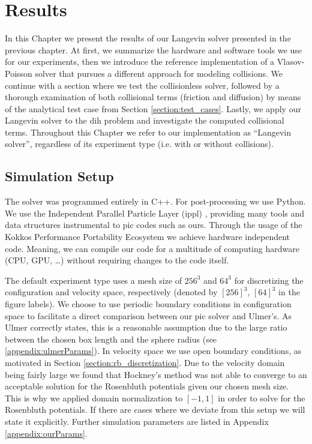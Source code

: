 \chapter{Results}
\label{chapter:results}

In this Chapter we present the results of our Langevin solver presented in the
previous chapter.
At first, we summarize the hardware and software tools we use for our experiments, then
we introduce the reference implementation of a Vlasov-Poisson solver that pursues a different
approach for modeling collisions.
We continue with a section where we test the collisionless solver, followed by a thorough
examination of both collisional terms (friction and diffusion) by means of the analytical test case from Section
\ref{section:test_cases}.
Lastly, we apply our Langevin solver to the \gls{dih} problem and investigate the
computed collisional terms.
Throughout this Chapter we refer to our implementation as ``Langevin solver'', regardless of its
experiment type (i.e. with or without collisions).

\section{Simulation Setup}
\label{section:simulation_setup}

The solver was programmed entirely in C++. For post-processing we use Python.
We use the Independent Parallel Particle Layer (\gls{ippl}) \cite{IPPL}, providing many tools and data structures instrumental to \gls{pic} codes such as ours.
Through the usage of the Kokkos Performance Portability Ecosystem \cite{trott2021kokkos}
we achieve hardware independent code. Meaning, we can compile our code for a multitude of computing
hardware (CPU, GPU, \dots) without requiring changes to the code itself.

The default experiment type uses a mesh size of $256^3$ and $64^3$ for discretizing the
configuration and velocity space, respectively (denoted by $[256]^3$, $[64]^3$ in the figure labels).
We choose to use periodic boundary conditions in configuration space to facilitate a direct
comparison between our \gls{pic} solver and Ulmer's.
As Ulmer correctly states, this is a reasonable assumption due to the large ratio between the chosen
box length and the sphere radius (see \ref{appendix:ulmerParams}).
In velocity space we use open boundary conditions, as motivated in Section \ref{section:rb_discretization}.
Due to the velocity domain being fairly large we found that Hockney's method was not able to
converge to an acceptable solution for the Rosenbluth potentials given our chosen mesh size.
This is why we applied domain normalization to $[-1,1]$ in order to solve for the Rosenbluth potentials.
If there are cases where we deviate from this setup we will state it explicitly.
Further simulation parameters are listed in Appendix \ref{appendix:ourParams}.

